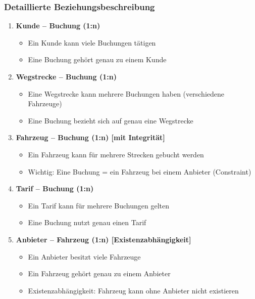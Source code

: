 \documentclass[12pt,a4paper]{article}
\begin{document}
\subsubsection*{Detaillierte Beziehungsbeschreibung}

\begin{enumerate}
    \item \textbf{Kunde -- Buchung (1:n)}
    \begin{itemize}
        \item Ein Kunde kann viele Buchungen tätigen
        \item Eine Buchung gehört genau zu einem Kunde
    \end{itemize}

    \item \textbf{Wegstrecke -- Buchung (1:n)}
    \begin{itemize}
        \item Eine Wegstrecke kann mehrere Buchungen haben (verschiedene Fahrzeuge)
        \item Eine Buchung bezieht sich auf genau eine Wegstrecke
    \end{itemize}

    \item \textbf{Fahrzeug -- Buchung (1:n) [mit Integrität]}
    \begin{itemize}
        \item Ein Fahrzeug kann für mehrere Strecken gebucht werden
        \item Wichtig: Eine Buchung = ein Fahrzeug bei einem Anbieter (Constraint)
    \end{itemize}

    \item \textbf{Tarif -- Buchung (1:n)}
    \begin{itemize}
        \item Ein Tarif kann für mehrere Buchungen gelten
        \item Eine Buchung nutzt genau einen Tarif
    \end{itemize}

    \item \textbf{Anbieter -- Fahrzeug (1:n) [Existenzabhängigkeit]}
    \begin{itemize}
        \item Ein Anbieter besitzt viele Fahrzeuge
        \item Ein Fahrzeug gehört genau zu einem Anbieter
        \item Existenzabhängigkeit: Fahrzeug kann ohne Anbieter nicht existieren
    \end{itemize}


\end{enumerate}
\end{document}
